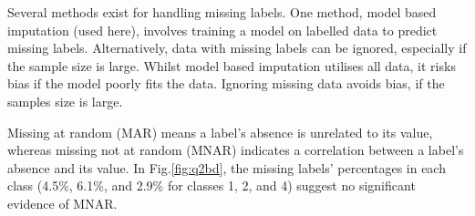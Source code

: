     Several methods exist for handling missing labels.
    One method, model based imputation (used here), involves training a model on labelled data to predict missing labels.
    Alternatively, data with missing labels can be ignored, especially if the sample size is large.
    Whilst model based imputation utilises all data, it risks bias if the model poorly fits the data.
    Ignoring missing data avoids bias, if the samples size is large.

    Missing at random (MAR) means a label's absence is unrelated to its value, whereas missing not at random (MNAR)
    indicates a correlation between a label's absence and its value.
    In Fig.\eqref{fig:q2bd}, the missing labels' percentages in each class (4.5\%, 6.1\%, and 2.9\% for classes 1, 2,
    and 4) suggest no significant evidence of MNAR.
